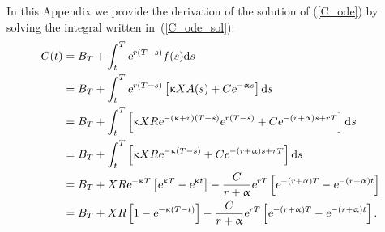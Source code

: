In this Appendix we provide the derivation of the solution of (\ref{C_ode}) by solving the integral written in~(\ref{C_ode_sol}):
$$
\begin{aligned}
	C(t) 	&= B_T + \int_t^T \text{\sl e}^{r(T-s)}f(s)\text{\rm d} s\\
	&= B_T + \int_t^T \text{\sl e}^{r(T-s)}\left[\upkappa X A(s) + C\text{\sl e}^{-\upalpha s}\right]\text{\rm d} s\\
	&= B_T + \int_t^T \left[\upkappa X R \text{\sl e}^{- (\upkappa + r) (T-s)} \text{\sl e}^{r(T-s)} + C\text{\sl e}^{-(r+\upalpha)s+rT}\right]\text{\rm d} s\\
	&= B_T + \int_t^T \left[\upkappa X R \text{\sl e}^{-\upkappa (T-s)} + C\text{\sl e}^{-(r+\upalpha)s +rT}\right]\text{\rm d} s\\
	&= B_T + {X R \text{\sl e}^{-\upkappa T}}  \left[\text{\sl e}^{\upkappa T} - \text{\sl e}^{\upkappa t}\right] - \frac{C}{r+\upalpha}\text{\sl e}^{rT}\left[\text{\sl e}^{-(r+\upalpha)T}-\text{\sl e}^{-(r+\upalpha)t}\right]\\
	&= B_T + {X R}  \left[1 -  \text{\sl e}^{-\upkappa(T-t)}\right]- \frac{C}{r+\upalpha}\text{\sl e}^{rT}\left[\text{\sl e}^{-(r+\upalpha)T}-\text{\sl e}^{-(r+\upalpha)t}\right] .
\end{aligned}
$$